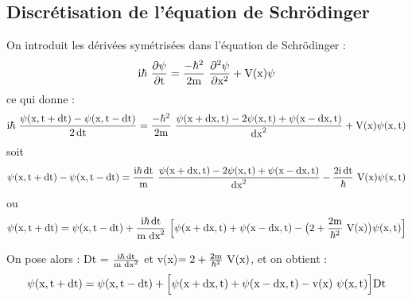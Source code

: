 \subsection{Discrétisation de l'équation de Schrödinger}
%
On introduit les dérivées symétrisées dans l'équation de Schrödinger :
\[
\mt{i}\hbar\ \frac{\partial\psi}{\partial\mt{t}} =
\frac{-\hbar^2}{2\mt{m}}\ \frac{\partial^2\psi}{\partial\mt{x}^2}
+\mt{V(x)}\psi
\]
%
ce qui donne :
\[
\mt{i}\hbar\ \frac{\psi(\mt{x},\mt{t}+\dt)-\psi(\mt{x},\mt{t}-\dt)}{2\dt} =
\frac{-\hbar^2}{2\mt{m}}\ \frac{\psi(\mt{x}+\mt{dx},\mt{t})-2\psi(\mt{x},\mt{t})+\psi(\mt{x}-\mt{dx},\mt{t})}{\mt{dx}^2}
+\mt{V(x)}\psi(\mt{x},\mt{t})
\]
%
soit
\[
\psi(\mt{x},\mt{t}+\dt)-\psi(\mt{x},\mt{t}-\dt)=
\frac{\mt{i}\hbar\dt}{\mt{m}}\ \frac{\psi(\mt{x}+\mt{dx},\mt{t})-2\psi(\mt{x},\mt{t})+\psi(\mt{x}-\mt{dx},\mt{t})}{\mt{dx}^2}
-\frac{2\mt{i}\dt}{\hbar}\ \mt{V(x)}\psi(\mt{x},\mt{t})
\]
ou
\[
\psi(\mt{x},\mt{t}+\dt)=\psi(\mt{x},\mt{t}-\dt)+
\frac{\mt{i}\hbar\dt}{\mt{m }\mt{dx}^2}\ \Big[\psi(\mt{x}+\mt{dx},\mt{t})+\psi(\mt{x}-\mt{dx},\mt{t})
-\big(2+\frac{2\mt{m}}{\hbar^2}\ \mt{V(x)}\big)\psi(\mt{x},\mt{t})\Big]
\]

On pose alors : Dt = $\frac{\text{i}\hbar\operatorname{dt}}{\text{m }\text{dx}^2}$ et v(x)$=2+\frac{2\mt{m}}{\hbar^2}\ \mt{V(x)}$, et on obtient :
\[
\psi(\text{x},\text{t}+\operatorname{dt})=\psi(\text{x},\text{t}-\operatorname{dt})+
\Big[\psi(\text{x}+\text{dx},\text{t})+\psi(\text{x}-\text{dx},\text{t})
-\text{v(x) }\psi(\text{x},\text{t})\Big]\text{Dt}
\]
